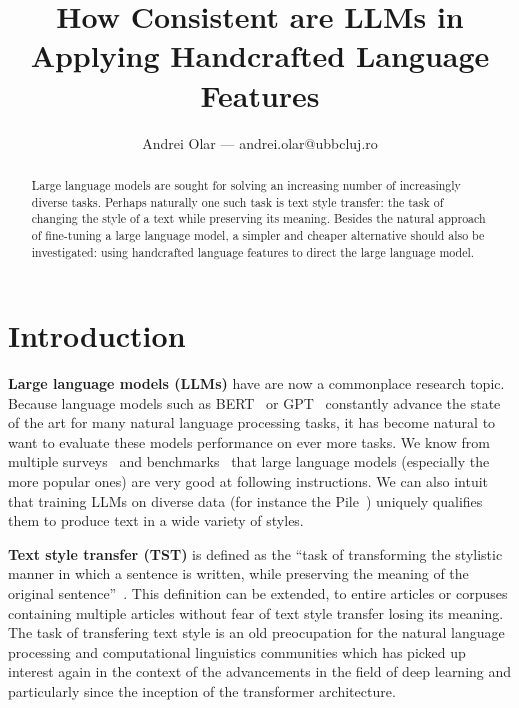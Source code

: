 \documentclass[runningheads,a4paper,11pt]{article}
\begin{document}
\title{How Consistent are LLMs in Applying Handcrafted Language Features}
\author{Andrei Olar --- andrei.olar@ubbcluj.ro}
\maketitle
\begin{abstract}
    Large language models are sought for solving an increasing number of
    increasingly diverse tasks. Perhaps naturally one such task is text style
    transfer: the task of changing the style of a text while preserving its
    meaning. Besides the natural approach of fine-tuning a large language model,
    a simpler and cheaper alternative should also be investigated: using
    handcrafted language features to direct the large language model.
\end{abstract}

\section{Introduction}\label{introduction}

\textbf{Large language models (LLMs)} have are now a commonplace research topic.
Because language models such as BERT~\cite{devlin2018bert} or GPT~\cite{gpt-2018,gpt2-2019,
gpt3-2020} constantly advance the state of the art for many natural language
processing tasks, it has become natural to want to evaluate these models
performance on ever more tasks.
We know from multiple surveys~\cite{minaee2024llmsurvey,zhao2023survey} and
benchmarks~\cite{papcode2024hellaswag,chiang2024chatbot} that large language
models (especially the more popular ones) are very good at following
instructions.
We can also intuit that training LLMs on diverse data (for instance the
Pile~\cite{gao2020pile}) uniquely qualifies them to produce text in a wide
variety of styles.

\textbf{Text style transfer (TST)} is defined as the ``task of transforming the
stylistic manner in which a sentence is written, while preserving the meaning of
the original sentence''~\cite{tst-review-2021}.
This definition can be extended, to entire articles or corpuses containing
multiple articles without fear of text style transfer losing its meaning.
The task of transfering text style is an old preocupation for the natural
language processing and computational linguistics communities which has picked
up interest again in the context of the advancements in the field of deep
learning and particularly since the inception of the transformer architecture.
\end{document}
